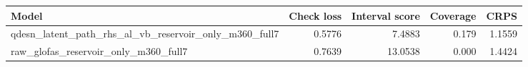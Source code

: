 \begin{tabular}{lrrrr}
\toprule
Model & Check loss & Interval score & Coverage & CRPS \\
\midrule
qdesn_latent_path_rhs_al_vb_reservoir_only_m360_full7 & 0.5776 & 7.4883 & 0.179 & 1.1559 \\
raw_glofas_reservoir_only_m360_full7 & 0.7639 & 13.0538 & 0.000 & 1.4424 \\
\bottomrule
\end{tabular}
